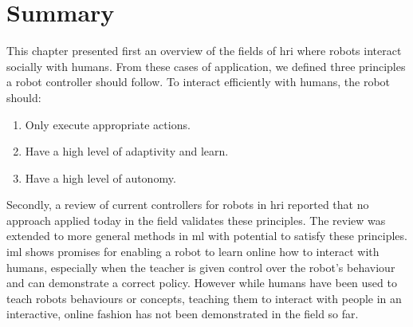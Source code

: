 \section{Summary}

This chapter presented first an overview of the fields of \gls{hri} where robots interact socially with humans. From these cases of application, we defined three principles a robot controller should follow. To interact efficiently with humans, the robot should:
\begin{enumerate}
   	\item Only execute appropriate actions.
   	\item Have a high level of adaptivity and learn.
   	\item Have a high level of autonomy.
\end{enumerate}

Secondly, a review of current controllers for robots in \gls{hri} reported that no approach applied today in the field validates these principles. The review was extended to more general methods in \gls{ml} with potential to satisfy these principles. \gls{iml} shows promises for enabling a robot to learn online how to interact with humans, especially when the teacher is given control over the robot's behaviour and can demonstrate a correct policy. However while humans have been used to teach robots behaviours or concepts, teaching them to interact with people in an interactive, online fashion has not been demonstrated in the field so far.
